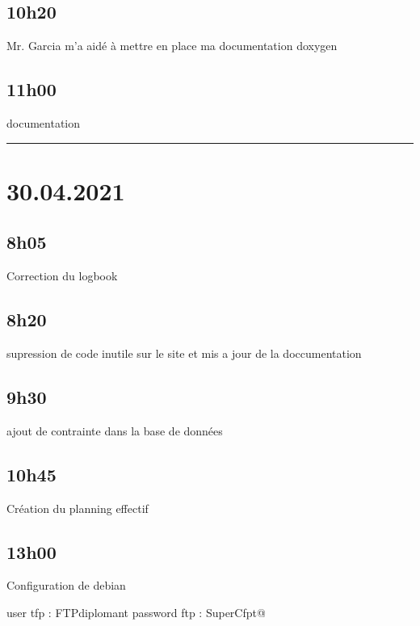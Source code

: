 \documentclass[a4paper,12pt,french]{sphinxmanual}
\begin{document}
\subsection{10h20}
\label{\detokenize{logbook:id50}}
\sphinxAtStartPar
Mr. Garcia m’a aidé à mettre en place ma documentation doxygen


\subsection{11h00}
\label{\detokenize{logbook:id51}}
\sphinxAtStartPar
documentation


\bigskip\hrule\bigskip



\section{30.04.2021}
\label{\detokenize{logbook:id52}}

\subsection{8h05}
\label{\detokenize{logbook:id53}}
\sphinxAtStartPar
Correction du logbook


\subsection{8h20}
\label{\detokenize{logbook:id54}}
\sphinxAtStartPar
supression de code inutile sur le site et mis a jour de la doccumentation


\subsection{9h30}
\label{\detokenize{logbook:id55}}
\sphinxAtStartPar
ajout de contrainte dans la base de données


\subsection{10h45}
\label{\detokenize{logbook:id56}}
\sphinxAtStartPar
Création du planning effectif


\subsection{13h00}
\label{\detokenize{logbook:id57}}
\sphinxAtStartPar
Configuration de debian

\sphinxAtStartPar
user tfp : FTPdiplomant
password ftp : SuperCfpt@
\end{document}
